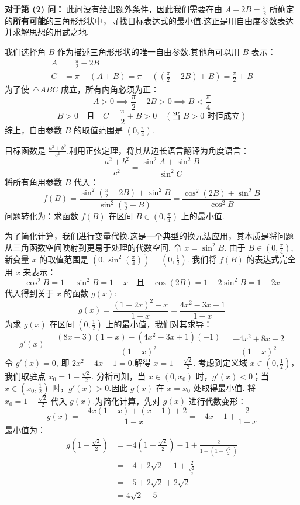 \begin{solution}
	\textbf{对于第 (2) 问：}
	此问没有给出额外条件，因此我们需要在由 $A+2B=\frac{\pi}{2}$ 所确定的\textbf{所有可能}的三角形形状中，寻找目标表达式的最小值.这正是用自由度参数表达并求解思想的用武之地.
	
	我们选择角 $B$ 作为描述三角形形状的唯一自由参数.其他角可以用 $B$ 表示：
	\begin{align*}
		A &= \frac{\pi}{2}-2B \\
		C &= \pi - (A+B) = \pi - \left(\left(\frac{\pi}{2}-2B\right)+B\right) = \frac{\pi}{2}+B
	\end{align*}
	为了使 $\triangle ABC$ 成立，所有内角必须为正：
	\[
	A > 0 \implies \frac{\pi}{2}-2B > 0 \implies B < \frac{\pi}{4}
	\]
	\[
	B > 0 \quad \text{且} \quad C = \frac{\pi}{2}+B > 0 \quad (\text{当 } B>0 \text{ 时恒成立})
	\]
	综上，自由参数 $B$ 的取值范围是 $(0, \frac{\pi}{4})$.
	
	目标函数是 $\frac{a^2+b^2}{c^2}$.利用正弦定理，将其从边长语言翻译为角度语言：
	\[
	\frac{a^2+b^2}{c^2} = \frac{\sin^2 A + \sin^2 B}{\sin^2 C}
	\]
	将所有角用参数 $B$ 代入：
	\[
	f(B) = \frac{\sin^2(\frac{\pi}{2}-2B) + \sin^2 B}{\sin^2(\frac{\pi}{2}+B)} = \frac{\cos^2(2B) + \sin^2 B}{\cos^2 B}
	\]
	问题转化为：求函数 $f(B)$ 在区间 $B \in (0, \frac{\pi}{4})$ 上的最小值.
	
	为了简化计算，我们进行变量代换.这是一个典型的换元法应用，其本质是将问题从三角函数空间映射到更易于处理的代数空间.
	令 $x = \sin^2 B$.
	由于 $B \in (0, \frac{\pi}{4})$, 新变量 $x$ 的取值范围是 $(0, \sin^2(\frac{\pi}{4})) = (0, \frac{1}{2})$.
	我们将 $f(B)$ 的表达式完全用 $x$ 来表示：
	\[
	\cos^2 B = 1-\sin^2 B = 1-x \quad \text{且} \quad \cos(2B) = 1-2\sin^2 B = 1-2x
	\]
	代入得到关于 $x$ 的函数 $g(x)$:
	\[
	g(x) = \frac{(1-2x)^2+x}{1-x} = \frac{4x^2-3x+1}{1-x}
	\]
	为求 $g(x)$ 在区间 $(0, \frac{1}{2})$ 上的最小值，我们对其求导：
	\[
	g'(x) = \frac{(8x-3)(1-x) - (4x^2-3x+1)(-1)}{(1-x)^2} = \frac{-4x^2+8x-2}{(1-x)^2}
	\]
	令 $g'(x)=0$, 即 $2x^2-4x+1 = 0$.解得 $x = 1 \pm \frac{\sqrt{2}}{2}$.
	考虑到定义域 $x \in (0, \frac{1}{2})$，我们取驻点 $x_0 = 1 - \frac{\sqrt{2}}{2}$.
	分析可知，当 $x \in (0, x_0)$ 时，$g'(x)<0$；当 $x \in (x_0, \frac{1}{2})$ 时，$g'(x)>0$.因此 $g(x)$ 在 $x=x_0$ 处取得最小值.
	将 $x_0 = 1 - \frac{\sqrt{2}}{2}$ 代入 $g(x)$.为简化计算，先对 $g(x)$ 进行代数变形：
	\[
	g(x) = \frac{-4x(1-x)+(x-1)+2}{1-x} = -4x-1+\frac{2}{1-x}
	\]
	最小值为：
	\begin{align*}
		g\left(1 - \frac{\sqrt{2}}{2}\right) &= -4\left(1-\frac{\sqrt{2}}{2}\right) - 1 + \frac{2}{1-\left(1-\frac{\sqrt{2}}{2}\right)} \\
		&= -4 + 2\sqrt{2} - 1 + \frac{2}{\frac{\sqrt{2}}{2}} \\
		&= -5 + 2\sqrt{2} + 2\sqrt{2} \\
		&= 4\sqrt{2}-5
	\end{align*}\hfill\qedsymbol
\end{solution}


